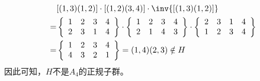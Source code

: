 \[
\begin{aligned}
&[(1,3)(1,2)]\cdot[(1,2)(3,4)]\cdot\inv{[(1,3)(1,2)]}\\
=&
\left\{
\begin{array}{cccc}
1&2&3&4\\
2&3&1&4
\end{array}\right\}
\cdot\left\{
\begin{array}{cccc}
1&2&3&4\\
2&1&4&3
\end{array}\right\}
\cdot\left\{
\begin{array}{cccc}
2&3&1&4\\
1&2&3&4
\end{array}\right\}
\\
=&
\left\{
\begin{array}{cccc}
1&2&3&4\\
4&3&2&1
\end{array}\right\}
=(1,4)(2,3)\notin H
\end{aligned}
\]
因此可知，$H$不是$A_4$的正规子群。

